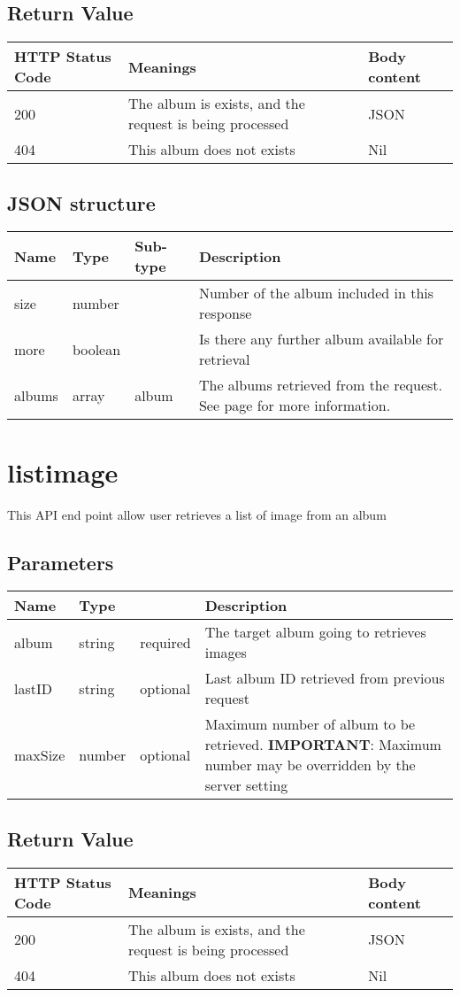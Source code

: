 \documentclass[a4paper,12pt]{report}
\newcommand{\see}[1]{See page \pageref{#1} for more information.}
\begin{document}
	\subsection{Return Value}
	\begin{tabular}{|l|p{10cm}|l|}
		\hline
		HTTP Status Code & Meanings & Body content  \\\hline
		200 & The album is exists, and the request is being processed & JSON\\\hline
		404 & This album does not exists & Nil\\\hline
	\end{tabular}
	\subsection{JSON structure}
	\begin{tabular}{|l|l|l|p{10cm}|}
		\hline
		Name & Type & Sub-type & Description\\\hline
		size & number & & Number of the album included in this response\\\hline
		more & boolean & & Is there any further album available for retrieval\\\hline
		albums & array & album & The albums retrieved from the request. \see{obj:album}\\\hline
	\end{tabular}
	
	\section{listimage}
	This API end point allow user retrieves a list of image from an album
	\subsection{Parameters}
	\begin{tabular}{|l|ll|p{10cm}|}
		\hline
		Name & Type & & Description\\\hline
		album & string & required & The target album going to retrieves images\\\hline
		lastID & string & optional & Last album ID retrieved from previous request\\\hline
		maxSize & number & optional & Maximum number of album to be retrieved.\newline
		\textbf{IMPORTANT}: Maximum number may be overridden by the server setting \\\hline
	\end{tabular}
	\subsection{Return Value}
	\begin{tabular}{|l|p{10cm}|l|}
		\hline
		HTTP Status Code & Meanings & Body content  \\\hline
		200 & The album is exists, and the request is being processed & JSON\\\hline
		404 & This album does not exists & Nil\\\hline
	\end{tabular}
\end{document}

